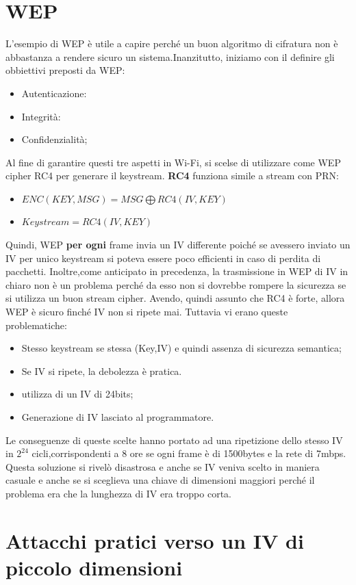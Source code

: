 \documentclass{book}
\theoremstyle{remark}
\begin{document}
\chapter{WEP}
L'esempio di WEP è utile a capire perché un buon algoritmo di cifratura non è abbastanza a rendere sicuro un sistema\@.Inanzitutto, iniziamo con il definire gli obbiettivi preposti da WEP\@:
\begin{itemize}
	\item Autenticazione:
	\item Integrità:
	\item Confidenzialità;\@
\end{itemize}
Al fine di garantire questi tre aspetti in Wi-Fi, si scelse di utilizzare come WEP cipher RC4 per generare il keystream\@.
\textbf{RC4} funziona simile a stream con PRN\@:
\begin{itemize}
	\item \(ENC(KEY,MSG)= MSG \bigoplus RC4(IV,KEY)\)
	\item \(Keystream = RC4(IV,KEY)\)
\end{itemize}
Quindi, WEP \textbf{per ogni} frame invia un IV differente poiché se avessero inviato un IV per unico keystream si poteva essere poco efficienti in caso di perdita di pacchetti\@. Inoltre,come  anticipato in precedenza, la trasmissione in WEP di IV in chiaro non è un problema perché da esso non si dovrebbe rompere la sicurezza se si utilizza un buon stream cipher\@.
Avendo, quindi assunto che RC4 è forte, allora WEP è sicuro finché IV non si ripete mai\@. Tuttavia vi erano queste problematiche:
\begin{itemize}
	\item Stesso keystream se stessa (Key,IV) e quindi assenza di sicurezza semantica;\@
	\item Se IV si ripete, la debolezza è pratica\@.
	\item utilizza di un IV di 24bits;\@
	\item Generazione di IV lasciato al programmatore\@.
\end{itemize}
Le conseguenze di queste scelte hanno portato ad una ripetizione dello stesso IV in \(2^{24}\) cicli,corrispondenti a 8 ore se ogni frame è di 1500bytes e la rete di 7mbps\@.
Questa soluzione si rivelò disastrosa e anche se IV veniva scelto in maniera casuale e anche se si sceglieva una chiave di dimensioni maggiori perché il problema era che la lunghezza di IV era troppo corta\@.
\chapter{Attacchi pratici verso un IV di piccolo dimensioni}
\end{document}
